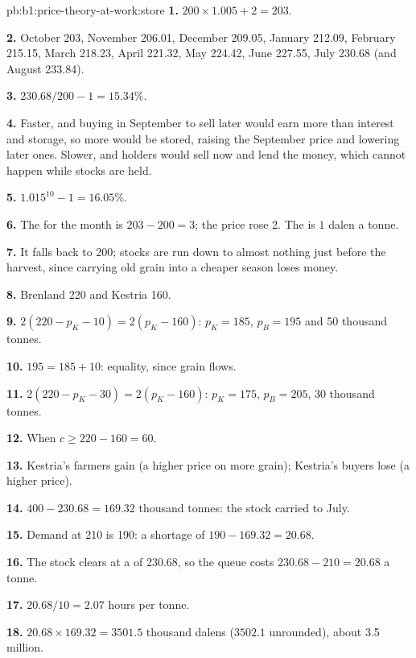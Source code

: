 \begin{solution}{pb:b1:price-theory-at-work:store}
\textbf{1.} $200 \times 1.005 + 2 = 203$.

\textbf{2.} October 203, November 206.01, December 209.05, January 212.09,
February 215.15, March 218.23, April 221.32, May 224.42, June 227.55, July
230.68 (and August 233.84).

\textbf{3.} $230.68/200 - 1 = 15.34\%$.

\textbf{4.} Faster, and buying in September to sell later would earn more
than interest and storage, so more would be stored, raising the
September price and lowering later ones. Slower, and holders would sell
now and lend the money, which cannot happen while stocks are held.

\textbf{5.} $1.015^{10} - 1 = 16.05\%$.

\textbf{6.} The  for the month is $203 - 200 = 3$; the price rose 2. The
 is $1$ dalen a tonne.

\textbf{7.} It falls back to 200; stocks are run down to almost nothing just
before the harvest, since carrying old grain into a cheaper season loses
money.

\textbf{8.} Brenland 220 and Kestria 160.

\textbf{9.} $2(220 - p_K - 10) = 2(p_K - 160)$: $p_K = 185$, $p_B = 195$ and 50 thousand tonnes.

\textbf{10.} $195 = 185 + 10$: equality, since grain flows.

\textbf{11.} $2(220 - p_K - 30) = 2(p_K - 160)$: $p_K = 175$, $p_B = 205$, 30 thousand tonnes.

\textbf{12.} When $c \ge 220 - 160 = 60$.

\textbf{13.} Kestria's farmers gain (a higher price on more grain); Kestria's
buyers lose (a higher price).

\textbf{14.} $400 - 230.68 = 169.32$ thousand tonnes: the stock carried to July.

\textbf{15.} Demand at 210 is 190: a shortage of $190 - 169.32 = 20.68$.

\textbf{16.} The stock clears at a  of 230.68, so the queue costs
$230.68 - 210 = 20.68$ a tonne.

\textbf{17.} $20.68/10 = 2.07$ hours per tonne.

\textbf{18.} $20.68 \times 169.32 = 3501.5$ thousand dalens ($3502.1$ unrounded), about 3.5 million.


\end{solution}
